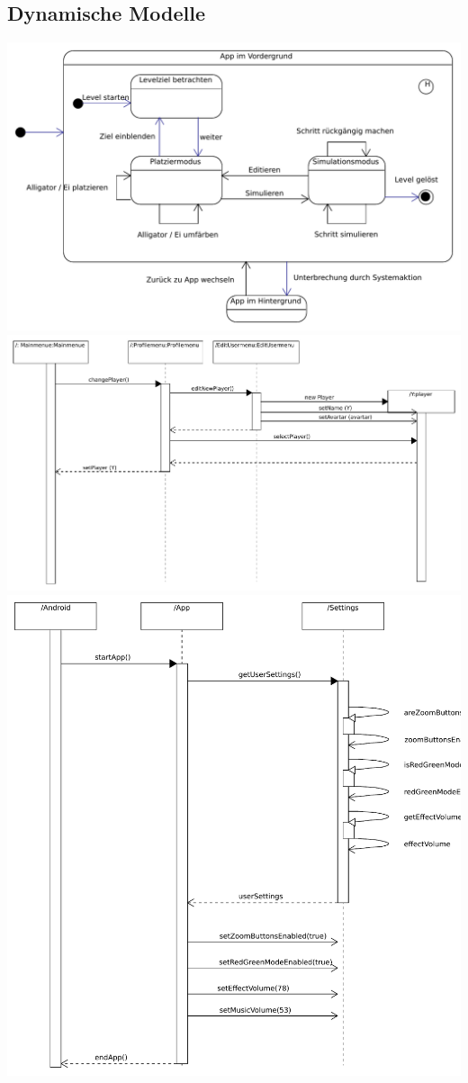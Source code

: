 \subsection{Dynamische Modelle}
\clearpage
\includegraphics[scale=0.6]{Systemmodelle/game_state.pdf}
\clearpage
\includegraphics[scale=0.6]{Systemmodelle/edit_new_player_sequence.pdf}
\clearpage
\includegraphics[scale=0.6]{Systemmodelle/edit_settings_sequence.pdf}
